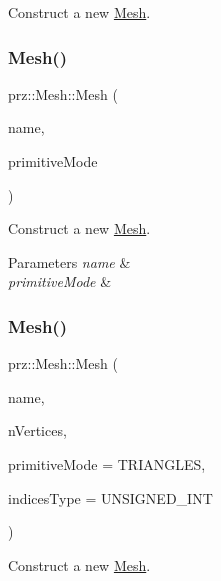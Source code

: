 Construct a new \mbox{\hyperlink{classprz_1_1_mesh}{Mesh}}. 

\mbox{\label{classprz_1_1_mesh_affbffa087c8ba58116135a94e043a22b}} 
\subsubsection{\texorpdfstring{Mesh()}{Mesh()}\hspace{0.1cm}{\footnotesize\ttfamily [2/4]}}
{\footnotesize\ttfamily prz\+::\+Mesh\+::\+Mesh (\begin{DoxyParamCaption}\item[{const P\+String \&}]{name,  }\item[{Primitive\+\_\+\+Mode}]{primitive\+Mode }\end{DoxyParamCaption})}



Construct a new \mbox{\hyperlink{classprz_1_1_mesh}{Mesh}}. 


\begin{DoxyParams}{Parameters}
{\em name} & \\
\hline
{\em primitive\+Mode} & \\
\hline
\end{DoxyParams}
\mbox{\label{classprz_1_1_mesh_a60ab064062ab3206f247207ddd41a176}} 
\subsubsection{\texorpdfstring{Mesh()}{Mesh()}\hspace{0.1cm}{\footnotesize\ttfamily [3/4]}}
{\footnotesize\ttfamily prz\+::\+Mesh\+::\+Mesh (\begin{DoxyParamCaption}\item[{const P\+String \&}]{name,  }\item[{G\+Lsizei}]{n\+Vertices,  }\item[{Primitive\+\_\+\+Mode}]{primitive\+Mode = {\ttfamily TRIANGLES},  }\item[{Indices\+\_\+\+Type}]{indices\+Type = {\ttfamily UNSIGNED\+\_\+INT} }\end{DoxyParamCaption})}



Construct a new \mbox{\hyperlink{classprz_1_1_mesh}{Mesh}}. 


